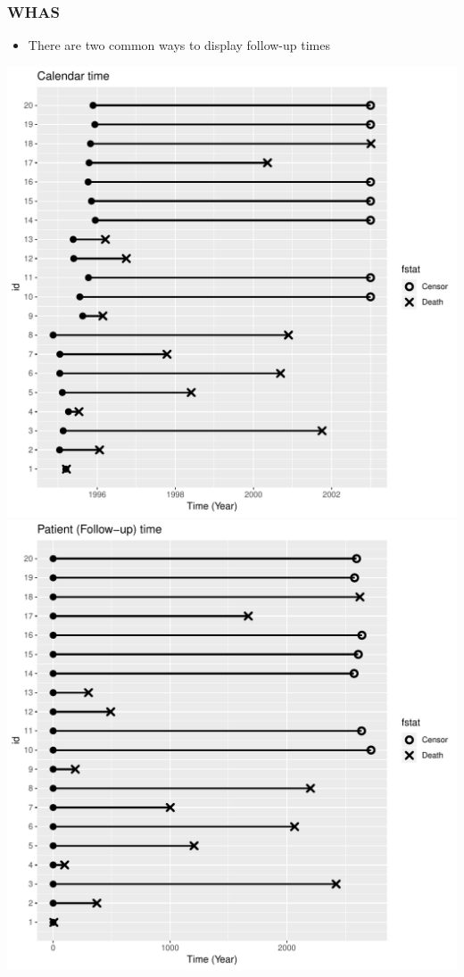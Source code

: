 \documentclass[10pt]{beamer}\usepackage[]{graphicx}\usepackage[]{color}
\begin{document}
\begin{frame}[fragile]
\frametitle{WHAS}
  \begin{itemize}
  \item There are two common ways to display follow-up times
  \end{itemize}
  \begin{center}
    \includegraphics[scale = .3]{tab1-1-1}\hspace{.5cm}
    \includegraphics[scale = .3]{tab1-1-2}
  \end{center}
\end{frame}
\end{document}
